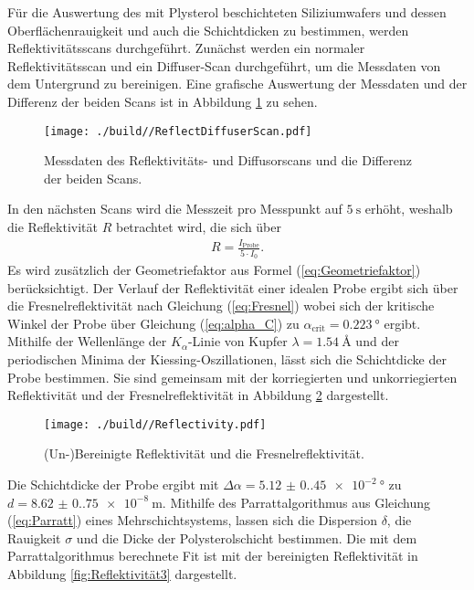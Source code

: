 Für die Auswertung des mit Plysterol beschichteten Siliziumwafers und dessen Oberflächenrauigkeit und auch die Schichtdicken zu bestimmen, werden Reflektivitätsscans durchgeführt.
Zunächst werden ein normaler Reflektivitätsscan und ein Diffuser-Scan durchgeführt, um die Messdaten von dem Untergrund zu bereinigen.
Eine grafische Auswertung der Messdaten und der Differenz der beiden Scans ist in Abbildung \ref{fig:Reflektivität} zu sehen.
\begin{figure}[H]
    \centering
    \texttt{[image: ./build//ReflectDiffuserScan.pdf]}
    \caption{Messdaten des Reflektivitäts- und Diffusorscans und die Differenz der beiden Scans.}
    \label{fig:Reflektivität}
\end{figure}
\noindent
In den nächsten Scans wird die Messzeit pro Messpunkt auf $\SI{5}{\second}$ erhöht, weshalb die Reflektivität $R$ betrachtet wird, die sich über
\begin{align*}
    R = \frac{I_{\text{Probe}}}{5\cdot I_{0}}.
\end{align*}
Es wird zusätzlich der Geometriefaktor aus Formel (\ref{eq:Geometriefaktor}) berücksichtigt.
Der Verlauf der Reflektivität einer idealen Probe ergibt sich über die Fresnelreflektivität nach Gleichung (\ref{eq:Fresnel}) %
wobei sich der kritische Winkel der Probe über Gleichung (\ref{eq:alpha_C}) zu $\alpha_{\text{crit}} = \SI{0.223}{\degree}$ ergibt.
Mithilfe der Wellenlänge der $K_{\alpha}$-Linie von Kupfer $\lambda = \SI{1.54}{\angstrom}$ und der periodischen Minima der Kiessing-Oszillationen, lässt sich die Schichtdicke der Probe bestimmen.
Sie sind gemeinsam mit der korriegierten und unkorriegierten Reflektivität und der Fresnelreflektivität in Abbildung \ref{fig:Reflektivität2} dargestellt.
\begin{figure}[H]
    \centering
    \texttt{[image: ./build//Reflectivity.pdf]}
    \caption{(Un-)Bereinigte Reflektivität und die Fresnelreflektivität.}
    \label{fig:Reflektivität2}
\end{figure}
\noindent
Die Schichtdicke der Probe ergibt mit $\Delta\alpha= \SI{5.12(0.45)e-2}{\degree}$ zu $d = \SI{8.62(0.75)e-8}{\meter}$. \newline
Mithilfe des Parrattalgorithmus aus Gleichung (\ref{eq:Parratt}) eines Mehrschichtsystems, lassen sich die Dispersion $\delta$, die Rauigkeit $\sigma$ und die Dicke der Polysterolschicht bestimmen.
Die mit dem Parrattalgorithmus berechnete Fit ist mit der bereinigten Reflektivität in Abbildung \ref{fig:Reflektivität3} dargestellt.
